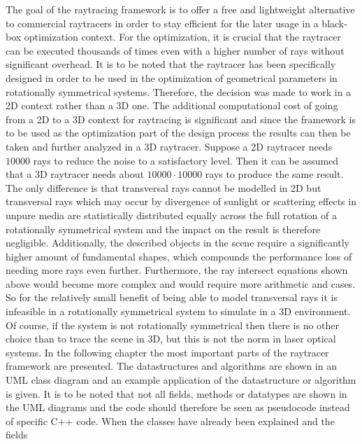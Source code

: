 \documentclass[a4paper,10pt]{article}
\begin{document}
    The goal of the raytracing framework is to offer a free and lightweight
    alternative to commercial raytracers in order to stay efficient
    for the later usage in a black-box optimization context.
    For the optimization, it is crucial that the raytracer can be executed thousands of times
    even with a higher number of rays without significant overhead.
    It is to be noted that the raytracer has been specifically designed in
    order to be used in the optimization of geometrical parameters in
    rotationally symmetrical systems.
    Therefore, the decision was made to work in a 2D context rather than a 3D
    one.
    The additional computational cost of going from a 2D to a 3D context for
    raytracing is significant and since the framework is to be used as
    the optimization part of the design process the results can then be
    taken and further analyzed in a 3D raytracer.
    Suppose a 2D raytracer needs $10000$ rays to reduce the noise to a
    satisfactory level.
    Then it can be assumed that a 3D raytracer needs about $10000 \cdot
    10000$ rays to produce the same result.
    The only difference is that transversal rays cannot be modelled in
    2D but transversal rays which may occur by divergence of sunlight or
    scattering effects in unpure media are statistically distributed
    equally across the full rotation of a rotationally symmetrical system and the impact
    on the result is therefore negligible.
    Additionally, the described objects in the scene require a significantly
    higher amount of fundamental shapes, which compounds the performance
    loss of needing more rays even further.
    Furthermore, the ray intersect equations shown above would become more
    complex and would require more arithmetic and cases.
    So for the relatively small benefit of being able to model transversal
    rays it is infeasible in a rotationally symmetrical system to simulate in a 3D environment.
    Of course, if the system is not rotationally symmetrical then there
    is no other choice than to trace the scene in 3D, but this is
    not the norm in laser optical systems.
    In the following chapter the most important parts of the raytracer
    framework are presented.
    The datastructures and algorithms are shown in an UML class diagram
    and an example application of the datastructure or algorithm is given. 
    It is to be noted that not all fields, methods or datatypes
    are shown in the UML diagrams and the code should therefore
    be seen as pseudocode instead of specific C++ code.
    When the classes have already been explained and the fields
\end{document}
